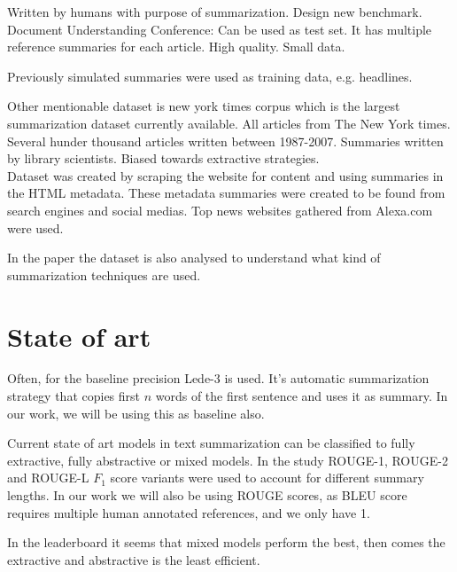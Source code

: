 \documentclass{article}
\begin{document}
Written by humans with purpose of summarization.
Design new benchmark. \\

Document Understanding Conference: Can be used as test set. It has multiple reference summaries for each article. High quality.
Small data. 

Previously simulated summaries were used as training data, e.g. headlines. 

Other mentionable dataset is new york times corpus which is the largest summarization dataset currently available. All articles from The New York times. Several hunder thousand articles written between 1987-2007. Summaries written by library scientists. Biased towards extractive strategies.\\

Dataset was created by scraping the website for content and using summaries in the HTML metadata. These metadata summaries were created to be found from search engines and social medias. Top news websites gathered from Alexa.com were used. 

In the paper \cite{dataset} the dataset is also analysed to understand what kind of summarization techniques are used.

\clearpage
\section{State of art }

Often, for the baseline precision Lede-3 is used. It's automatic summarization strategy that copies first $n$ words of the first sentence and uses it as summary. In our work, we will be using this as baseline also.

Current state of art models in text summarization can be classified to fully extractive, fully abstractive or mixed models. In the study \cite{dataset} ROUGE-1, ROUGE-2 and ROUGE-L $F_1$ score variants were used to account for different summary lengths. In our work we will also be using ROUGE scores, as BLEU score requires multiple human annotated references, and we only have 1.

In the leaderboard it seems that mixed models perform the best, then comes the extractive and abstractive is the least efficient.


	
\end{document}
